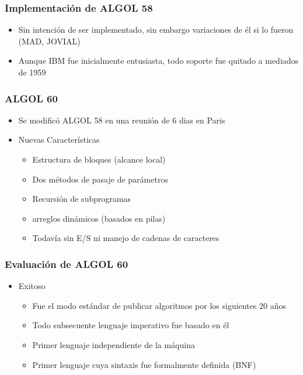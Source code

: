 \documentclass[11pt]{article}
\begin{document}
\subsubsection*{Implementación de ALGOL 58}
\label{sec:orgheadline58}
\begin{itemize}
\item Sin intención de ser implementado, sin embargo variaciones de él si
lo fueron (MAD, JOVIAL)
\item Aunque IBM fue inicialmente entusiasta, todo soporte fue quitado a
mediados de 1959
\end{itemize}

\subsubsection*{ALGOL 60}
\label{sec:orgheadline59}
\begin{itemize}
\item Se modificó ALGOL 58 en una reunión de 6 dias en Paris
\item Nuevas Características
\begin{itemize}
\item Estructura de bloques (alcance local)
\item Dos métodos de pasaje de parámetros
\item Recursión de subprogramas
\item arreglos dinámicos (basados en pilas)
\item Todavía sin E/S ni manejo de cadenas de caracteres
\end{itemize}
\end{itemize}

\subsubsection*{Evaluación de ALGOL 60}
\label{sec:orgheadline60}
\begin{itemize}
\item Exitoso
\begin{itemize}
\item Fue el modo estándar de publicar algoritmos por los siguientes 20 años
\item Todo subsecuente lenguaje imperativo fue basado en él
\item Primer lenguaje independiente de la máquina
\item Primer lenguaje cuya sintaxis fue formalmente definida (BNF)
\end{itemize}
\end{itemize}
\end{document}
